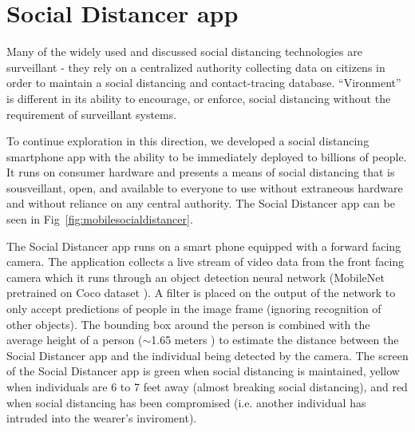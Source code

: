 \documentclass[journal]{journal}
\begin{document}
\section{Social Distancer app}
Many of the widely used and discussed social distancing technologies are surveillant - they rely on a centralized authority collecting data on citizens in order to maintain a social distancing and contact-tracing database. ``Vironment'' is different in its ability to encourage, or enforce, social distancing without the requirement of surveillant systems.

To continue exploration in this direction, we developed a social distancing smartphone app with the ability to be immediately deployed to billions of people. It runs on consumer hardware and presents a means of social distancing that is sousveillant, open, and available to everyone to use without extraneous hardware and without reliance on any central authority. The Social Distancer app can be seen in Fig~\ref{fig:mobilesocialdistancer}.




The Social Distancer app runs on a smart phone equipped with a forward facing camera. The application collects a live stream of video data from the front facing camera which it runs through an object detection neural network (MobileNet pretrained on Coco dataset \cite{DBLP:journals/corr/abs-1801-04381}). A filter is placed on the output of the network to only accept predictions of people in the image frame (ignoring recognition of other objects). The bounding box around the person is combined with the average height of a person ($\sim$1.65 meters \cite{ncd2016century}) to estimate the distance between the Social Distancer app and the individual being detected by the camera. The screen of the Social Distancer app is green when social distancing is maintained, yellow when individuals are 6 to 7 feet away (almost breaking social distancing), and red when social distancing has been compromised (i.e. another individual has intruded into the wearer's inviroment).
\end{document}
